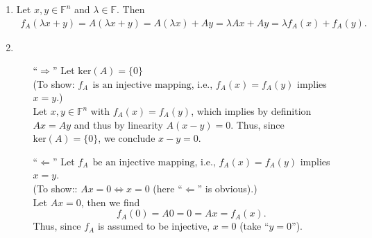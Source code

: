 { \color{solution}
\begin{enumerate}
	\item Let $x,y \in \mathbb{F}^{n} $ and $\lambda \in \mathbb{F}$. Then 
	\begin{align*}
	 f_A(\lambda x+y) = A(\lambda x + y) = A(\lambda x) + Ay = \lambda Ax + Ay = \lambda f_A(x) + f_A(y).
	\end{align*} 
	\item 
	\begin{itemize}
		\item[``$\Rightarrow$'']  
		Let $\text{ker} (A)  = \{0\}$\\ 
		(To show: $f_A ~~\text{is an injective mapping}$, i.e., $f_A(x) = f_A(y)$ implies $x = y$.)\\
		Let $x,y\in \mathbb{F}^{n}$ with $f_A(x) = f_A(y)$, which implies by definition
		 $Ax = Ay $
		and thus by linearity $A(x-y) =0$.
		Thus, since $\text{ker} (A)  = \{0\}$, we conclude $x-y = 0$.
		\item[``$\Leftarrow$''] 
		Let $f_A ~~\text{be an injective mapping}$, i.e., $f_A(x) = f_A(y)$ implies $x = y$.\\
		(To show:: $Ax = 0 \Leftrightarrow x = 0$ (here ``$\Leftarrow$'' is obvious).)\\
		Let $Ax=0$, then we find
		$$
		f_A(0) = A0 = 0 = Ax = f_A(x).
		$$
		Thus, since $f_A$ is assumed to be injective, $x = 0$ (take ``$y = 0$'').
	\end{itemize}
\end{enumerate}
}